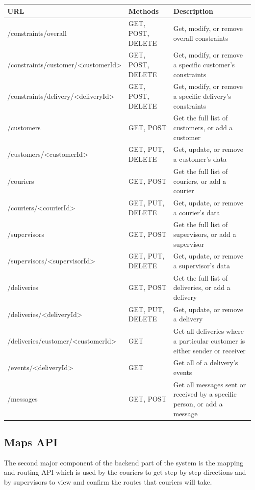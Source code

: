 \begin{center}
\begin{tabular}{ | m{6.1cm} | m{3.8cm}| m{6cm} | } 
\hline
URL & Methods & Description \\
\hline
/constraints/overall & GET, POST, DELETE & Get, modify, or remove overall constraints \\
\hline
/constraints/customer/<customerId> & GET, POST, DELETE & Get, modify, or remove a specific customer's constraints \\
\hline
/constraints/delivery/<deliveryId> & GET, POST, DELETE & Get, modify, or remove a specific delivery's constraints\\
\hline
/customers & GET, POST & Get the full list of customers, or add a customer\\
\hline
/customers/<customerId> & GET, PUT, DELETE & Get, update, or remove a customer's data\\
\hline
/couriers & GET, POST & Get the full list of couriers, or add a courier\\
\hline
/couriers/<courierId> & GET, PUT, DELETE & Get, update, or remove a courier's data\\
\hline
/supervisors & GET, POST & Get the full list of supervisors, or add a supervisor\\
\hline
/supervisors/<supervisorId> & GET, PUT, DELETE & Get, update, or remove a supervisor's data\\
\hline
/deliveries & GET, POST & Get the full list of deliveries, or add a delivery\\
\hline
/deliveries/<deliveryId> & GET, PUT, DELETE & Get, update, or remove a delivery\\
\hline
/deliveries/customer/<customerId> & GET & Get all deliveries where a particular customer is either sender or receiver\\
\hline
/events/<deliveryId> & GET & Get all of a delivery's events\\
\hline
/messages & GET, POST & Get all messages sent or received by a specific person, or add a message\\
\hline
\end{tabular}
\end{center}

\subsection{Maps API}

The second major component of the backend part of the system is the mapping and routing API which is used by the couriers to get step by step directions and by supervisors to view and confirm the routes that couriers will take.

